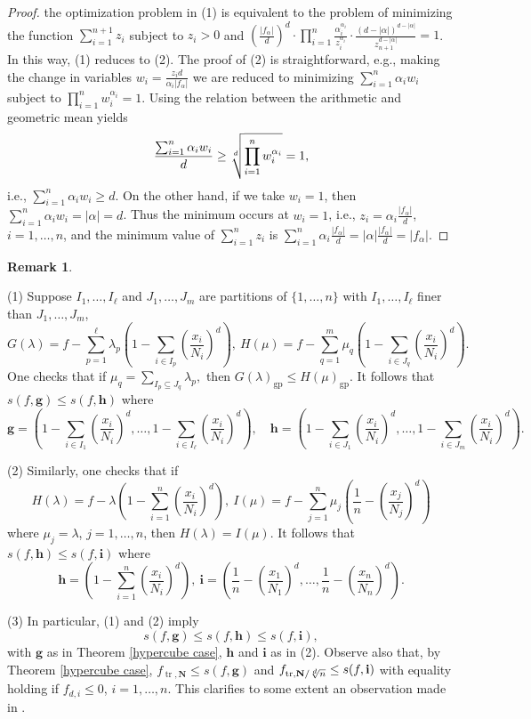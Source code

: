 \documentclass{amsart}
\theoremstyle{definition}
\newtheorem{rem}[thm]{Remark}
\begin{document}
%
\begin{proof} the optimization problem in (1) is equivalent to the problem of minimizing the function
$\sum_{i=1}^{n+1} z_i$ subject to $z_i>0$ and
$(\frac{|f_{\alpha}|}{d})^d\cdot \prod_{i=1}^n\frac{\alpha_i^{\alpha_i}}{z_i^{\alpha_i}}\cdot \frac{(d-|\alpha|)^{d-|\alpha|}}{z_{n+1}^{d-|\alpha|}} = 1$.
In this way, (1) reduces to (2). The proof of (2) is straightforward, e.g., making the change in variables
$w_i = \frac{z_i d}{\alpha_i |f_{\alpha}|}$ we are reduced to minimizing $\sum_{i=1}^n \alpha_iw_i$ subject to
$\prod_{i=1}^n w_i^{\alpha_i}=1$. Using the relation between the arithmetic and geometric mean yields
\[
	\frac{\sum_{i=1}^n \alpha_iw_i}{d}\ge \root d \of{\prod_{i=1}^n w_i^{\alpha_i}}= 1,
\]
i.e., $\sum_{i=1}^n \alpha_iw_i \ge d$. On the other hand, if we take $w_i=1$, then $\sum_{i=1}^n \alpha_iw_i = |\alpha|=d$.
Thus the minimum occurs at $w_i=1$, i.e., $z_i = \alpha_i \frac{|f_{\alpha}|}{d}$, $i=1,\dots,n$, and the minimum value of
$\sum_{i=1}^n z_i$ is $\sum_{i=1}^n \alpha_i \frac{|f_{\alpha}|}{d} = |\alpha|\frac{|f_{\alpha}|}{d} = |f_{\alpha}|$.
\end{proof}
%
\begin{rem} \

(1) Suppose $I_1,\dots,I_{\ell}$ and $J_1,\dots,J_m$ are partitions of $\{ 1,\dots,n\}$ with $I_1,\dots,I_{\ell}$ finer
than $J_1,\dots,J_m$,
\[
	G(\lambda) = f-\sum_{p=1}^{\ell}\lambda_p \left(1-\sum_{i\in I_p} (\frac{x_i}{N_i})^d\right), \ H(\mu) =
	f-\sum_{q=1}^m \mu_q\left(1-\sum_{i\in J_q}(\frac{x_i}{N_i})^d\right).
\]
One checks that if $\mu_q = \sum_{I_p\subseteq J_q} \lambda_p,$ then $G(\lambda)_{\operatorname{gp}} \le H(\mu)_{\operatorname{gp}}$.
It follows that $s(f,\mathbf{g}) \le s(f,\mathbf{h})$ where
\[
	\mathbf{g} = \left(1- \sum_{i\in I_1}(\frac{x_i}{N_i})^d,\dots,1- \sum_{i\in I_{\ell}}(\frac{x_i}{N_i})^d\right),
	\quad \mathbf{h} = \left(1- \sum_{i\in J_1}(\frac{x_i}{N_i})^d,\dots,1- \sum_{i\in J_m}(\frac{x_i}{N_i})^d\right).
\]

(2) Similarly, one checks that if
\[
	H(\lambda)= f-\lambda(1-\sum_{i=1}^n (\frac{x_i}{N_i})^d), \ I(\mu) = f-\sum_{j=1}^n \mu_j(\frac{1}{n}-(\frac{x_j}{N_j})^d)
\]
where $\mu_j = \lambda$, $j=1,\dots,n$, then $H(\lambda)=I(\mu)$. It follows that $s(f,\mathbf{h}) \le s(f,\mathbf{i})$ where
\[
	\mathbf{h}=\left(1-\sum_{i=1}^n(\frac{x_i}{N_i})^d\right),\ \mathbf{i}=\left(\frac{1}{n}-(\frac{x_1}{N_1})^d,\dots,\frac{1}{n}-(\frac{x_n}{N_n})^d\right).
\]


(3) In particular, (1) and (2) imply
\[
	s(f,\mathbf{g})\le s(f,\mathbf{h}) \le s(f,\mathbf{i}),
\]
with $\mathbf{g}$ as in Theorem \ref{hypercube case}, $\mathbf{h}$ and $\mathbf{i}$ as in (2). Observe also that, by
Theorem \ref{hypercube case}, $f_{\operatorname{tr},\mathbf{N}} \le s(f,\mathbf{g})$ and
$f_{\operatorname{tr},\mathbf{N}/\root d \of{n}} \le s(f,\mathbf{i})$ with equality holding if $f_{d,i}\le 0$, $i=1,\dots,n$.
This clarifies to some extent an observation made in \cite[Section 3]{gha-lass-mar}.
\end{rem}
\end{document}
